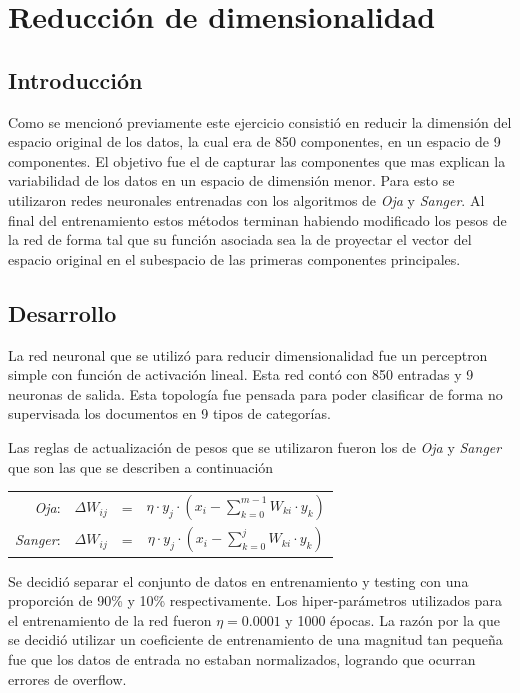\section{Reducción de dimensionalidad}

\subsection{Introducción}
Como se mencionó previamente este ejercicio consistió en reducir la dimensión
del espacio original de los datos, la cual era de 850 componentes, en un
espacio de 9 componentes. El objetivo fue el de capturar las componentes que
mas explican la variabilidad de los datos en un espacio de dimensión menor.
Para esto se utilizaron redes neuronales entrenadas con los algoritmos de
\textit{Oja} y \textit{Sanger}. Al final del entrenamiento estos métodos
terminan habiendo modificado los pesos de la red de forma tal que su función
asociada sea la de proyectar el vector del espacio original en el subespacio de
las primeras componentes principales.

\subsection{Desarrollo}
La red neuronal que se utilizó para reducir dimensionalidad fue un perceptron
simple con función de activación lineal. Esta red contó con 850 entradas y 9
neuronas de salida. Esta topología fue pensada para poder clasificar de forma
no supervisada los documentos en 9 tipos de categorías.

Las reglas de actualización de pesos que se utilizaron fueron los de \textit{Oja} y
 \textit{Sanger} que son las que se describen a continuación

\begin{center}
	\begin{tabular}{rccc}
		\emph{Oja}: & $\Delta W_{ij}$ & = & $\eta \cdot y_{j} \cdot (x_{i} - \displaystyle\sum_{k = 0}^{m-1} W_{ki} \cdot y_{k} )$ \\
		\emph{Sanger}: & $\Delta W_{ij}$ & = & $\eta \cdot y_{j} \cdot (x_{i} - \displaystyle\sum_{k = 0}^{j} W_{ki} \cdot y_{k} )$ \\
	\end{tabular}
\end{center}


Se decidió separar el conjunto de datos en entrenamiento y testing con una
proporción de 90\% y 10\% respectivamente. Los hiper-parámetros utilizados para
el entrenamiento de la red fueron $\eta = 0.0001$ y 1000 épocas. La razón por
la que se decidió utilizar un coeficiente de entrenamiento de una magnitud tan
pequeña fue que los datos de entrada no estaban normalizados, logrando que
ocurran errores de overflow.

